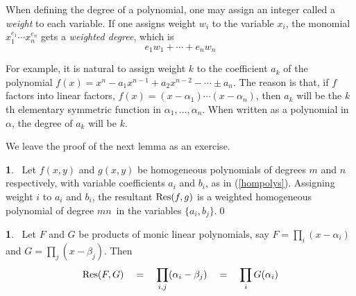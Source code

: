 \documentclass[leqno]{book}
\newcommand\Marginnote[1]{\marginnote{\hspace{-12pt}\normalfont{#1}}}
\theoremstyle{definition}%
\numberwithin{equation}{section}
\theoremstyle{theorem} %
\newtheorem{lemma}[equation]{}
\newtheorem{proposition}[equation]{}
\begin{document}
\ms When defining the degree of a polynomial, one may assign an
integer called a {\it weight} to each variable.  If one assigns weight
$w_i$ to the variable $x_i$, the monomial $x_1^{e_1}\cdots x_n^{e_n}$
gets a {\it weighted degree}, which is 
$$e_1w_1+\cdots + e_nw_n$$

\no
 For example, it is natural to assign weight $k$ to the coefficient
 $a_k$ of the polynomial $f(x) = x^n-a_1x^{n-1}+a_2x^{n-2} - \cdots
 \pm a_n$.  The reason is that, if $f$ factors into linear factors, $f(x) =
 (x-\alpha_1)\cdots(x-\alpha_n)$, then $a_k$ will be the $k$th elementary
 symmetric function in $\alpha_1,...,\alpha_n$.  When written as a
 polynomial in $\alpha$, the degree of $a_k$ will be $k$.

We leave the proof of the next lemma as an exercise.

\begin{lemma}{}\Marginnote{degresult}\;\,
Let $f(x,y)$ and $g(x,y)$ be homogeneous polynomials of degrees $m$
and $n$ respectively, with variable coefficients $a_i$ and $b_i$, as
in (\ref{hompolys}).  Assigning weight $i$ to $a_i$ and $b_i$, the
resultant $\operatorname{Res}(f,g)$ is a weighted homogeneous polynomial of degree
$mn$\, in the variables
$\{a_i,b_j\}$.\qed \label{degresult}\end{lemma}



\begin{proposition}{}\Marginnote{resroots}\;\,
Let $F$ and $G$ be 
products of monic linear polynomials, say $F = \prod_i(x-\alpha_i)$ and
$G = \prod_j(x-\beta_j).$ Then
$$\operatorname{Res}(F,G) \quad=\quad \prod_{i,j}(\alpha_i-\beta_j) \quad=\quad
\prod_i G(\alpha_i)$$
\label{resroots}\end{proposition}
\end{document}
